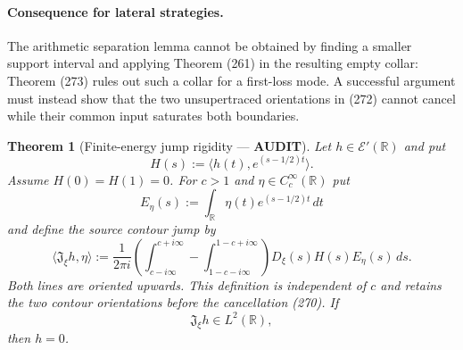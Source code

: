 \documentclass[11pt]{article}
\newtheorem{theorem}{Theorem}
\newcommand{\AUDIT}{\textcolor{orange!75!black}{\textbf{AUDIT}}}
\begin{document}
\paragraph{Consequence for lateral strategies.}
The arithmetic separation lemma cannot be obtained by finding a smaller
support interval and applying Theorem (261) in the resulting empty collar:
Theorem (273) rules out such a collar for a first-loss mode.  A successful
argument must instead show that the two unsupertraced orientations in (272)
cannot cancel while their common input saturates both boundaries.

\begin{theorem}[Finite-energy jump rigidity --- \AUDIT]
Let $h\in\mathcal E'(\mathbb R)$ and put
\begin{equation}
 H(s):=\langle h(t),e^{(s-1/2)t}\rangle.              \tag{274}
\end{equation}
Assume $H(0)=H(1)=0$.  For $c>1$ and
$\eta\in C_c^\infty(\mathbb R)$ put
\begin{equation}
 E_\eta(s):=\int_{\mathbb R}\eta(t)e^{(s-1/2)t}\,dt
\end{equation}
and define the source contour jump by
\begin{equation}
 \langle\mathfrak J_\xi h,\eta\rangle
 :=\frac1{2\pi i}\left(
 \int_{c-i\infty}^{c+i\infty}
 -\int_{1-c-i\infty}^{1-c+i\infty}\right)
 D_\xi(s)H(s)E_\eta(s)\,ds.                           \tag{275}
\end{equation}
Both lines are oriented upwards.  This definition is independent of $c$
and retains the two contour orientations before the cancellation (270).  If
\begin{equation}
 \mathfrak J_\xi h\in L^2(\mathbb R),                 \tag{276}
\end{equation}
then $h=0$.
\end{theorem}
\end{document}
